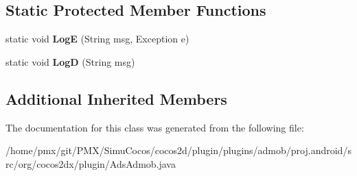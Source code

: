 \subsection*{Static Protected Member Functions}
\begin{DoxyCompactItemize}
\item 
\mbox{\label{classorg_1_1cocos2dx_1_1plugin_1_1AdsAdmob_a7b91c240466da2eca355a39edd977852}} 
static void {\bfseries LogE} (String msg, Exception e)
\item 
\mbox{\label{classorg_1_1cocos2dx_1_1plugin_1_1AdsAdmob_a0a3ad327ef400771eb3862a118e3c595}} 
static void {\bfseries LogD} (String msg)
\end{DoxyCompactItemize}
\subsection*{Additional Inherited Members}


The documentation for this class was generated from the following file\+:\begin{DoxyCompactItemize}
\item 
/home/pmx/git/\+P\+M\+X/\+Simu\+Cocos/cocos2d/plugin/plugins/admob/proj.\+android/src/org/cocos2dx/plugin/Ads\+Admob.\+java\end{DoxyCompactItemize}
